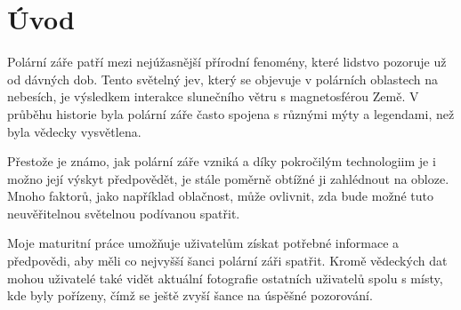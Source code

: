 \section{Úvod}
\par Polární záře patří mezi nejúžasnější přírodní fenomény, které lidstvo pozoruje už od dávných dob. Tento světelný jev, který se objevuje v polárních oblastech na nebesích, je výsledkem interakce slunečního větru s magnetosférou Země. V průběhu historie byla polární záře často spojena s různými mýty a legendami, než byla vědecky vysvětlena.
\par Přestože je známo, jak polární záře vzniká a díky pokročilým technologiim je i možno její výskyt předpovědět, je stále poměrně obtížné ji zahlédnout na obloze. Mnoho faktorů, jako například oblačnost, může ovlivnit, zda bude možné tuto neuvěřitelnou světelnou podívanou spatřit.
\par Moje maturitní práce umožňuje uživatelům získat potřebné informace a předpovědi, aby měli co nejvyšší šanci polární záři spatřit. Kromě vědeckých dat mohou uživatelé také vidět aktuální fotografie ostatních uživatelů spolu s místy, kde byly pořízeny, čímž se ještě zvyší šance na úspěšné pozorování.
